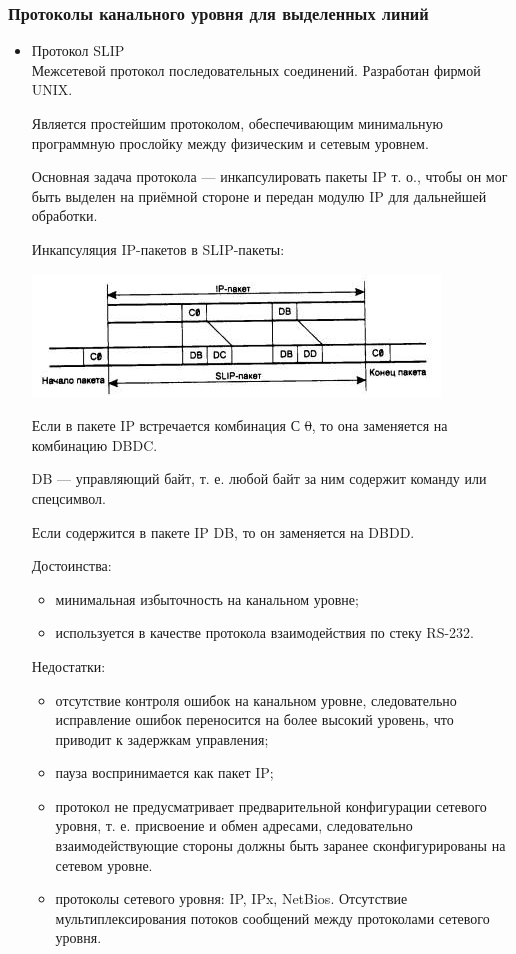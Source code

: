 \documentclass[12pt, russian, oneside, article]{ncc}
\begin{document}
\subsubsection{Протоколы канального уровня для выделенных линий}
\label{sec-5_2_11}
\begin{itemize}

\item Протокол SLIP\\
\label{sec-5_2_11_1}%
Межсетевой протокол последовательных соединений. Разработан фирмой UNIX.

Является простейшим протоколом, обеспечивающим минимальную программную прослойку между физическим и сетевым уровнем.

Основная задача протокола — инкапсулировать пакеты IP т. о., чтобы он мог быть выделен на приёмной стороне и передан модулю IP для дальнейшей обработки.

Инкапсуляция IP-пакетов в SLIP-пакеты:

\includegraphics[]{images/SiSPI/slip.jpg}

Если в пакете IP встречается комбинация С \st{0}, то она заменяется на комбинацию DBDC.

DB — управляющий байт, т. е. любой байт за ним содержит команду или спецсимвол.

Если содержится в пакете IP DB, то он заменяется на DBDD.

Достоинства:
\begin{itemize}
\item минимальная избыточность на канальном уровне;
\item используется в качестве протокола взаимодействия по стеку RS-232.
\end{itemize}

Недостатки:
\begin{itemize}
\item отсутствие контроля ошибок на канальном уровне, следовательно исправление ошибок переносится на более высокий уровень, что приводит к задержкам управления;
\item пауза воспринимается как пакет IP;
\item протокол не предусматривает предварительной конфигурации сетевого уровня, т. е. присвоение и обмен адресами, следовательно взаимодействующие стороны должны быть заранее сконфигурированы на сетевом уровне.
\item протоколы сетевого уровня: IP, IPx, NetBios. Отсутствие мультиплексирования потоков сообщений между протоколами сетевого уровня.
\end{itemize}



\end{itemize}
\end{document}
